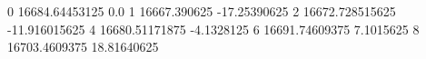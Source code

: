 0 16684.64453125 0.0
1 16667.390625 -17.25390625
2 16672.728515625 -11.916015625
4 16680.51171875 -4.1328125
6 16691.74609375 7.1015625
8 16703.4609375 18.81640625
